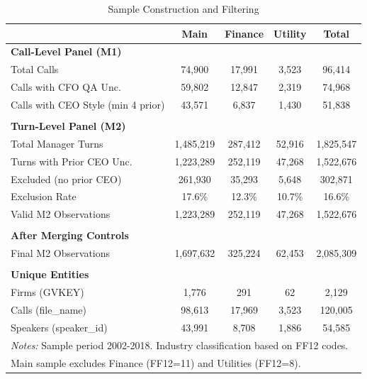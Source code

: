 \documentclass[11pt]{article}
\begin{document}
\newpage

\begin{table}[htbp]
\centering
\caption{Sample Construction and Filtering}
\label{tab:sample}
\footnotesize
\setlength{\tabcolsep}{8pt}
\begin{tabular}{lcccc}
\toprule
 & Main & Finance & Utility & Total \\
\midrule
\textbf{Call-Level Panel (M1)} \\
Total Calls & 74,900 & 17,991 & 3,523 & 96,414 \\
Calls with CFO QA Unc. & 59,802 & 12,847 & 2,319 & 74,968 \\
Calls with CEO Style (min 4 prior) & 43,571 & 6,837 & 1,430 & 51,838 \\
 &  &  &  & \\
\textbf{Turn-Level Panel (M2)} \\
Total Manager Turns & 1,485,219 & 287,412 & 52,916 & 1,825,547 \\
Turns with Prior CEO Unc. & 1,223,289 & 252,119 & 47,268 & 1,522,676 \\
Excluded (no prior CEO) & 261,930 & 35,293 & 5,648 & 302,871 \\
Exclusion Rate & 17.6\% & 12.3\% & 10.7\% & 16.6\% \\
Valid M2 Observations & 1,223,289 & 252,119 & 47,268 & 1,522,676 \\
 &  &  &  & \\
\textbf{After Merging Controls} \\
Final M2 Observations & 1,697,632 & 325,224 & 62,453 & 2,085,309 \\
 &  &  &  & \\
\textbf{Unique Entities} \\
Firms (GVKEY) & 1,776 & 291 & 62 & 2,129 \\
Calls (file\_name) & 98,613 & 17,969 & 3,523 & 120,005 \\
Speakers (speaker\_id) & 43,991 & 8,708 & 1,886 & 54,585 \\
\bottomrule
\multicolumn{5}{l}{\parbox{\linewidth}{\footnotesize \textit{Notes:} Sample period 2002-2018. Industry classification based on FF12 codes.}} \\
\multicolumn{5}{l}{\parbox{\linewidth}{\footnotesize Main sample excludes Finance (FF12=11) and Utilities (FF12=8).}} \\
\end{tabular}
\end{table}
\end{document}
